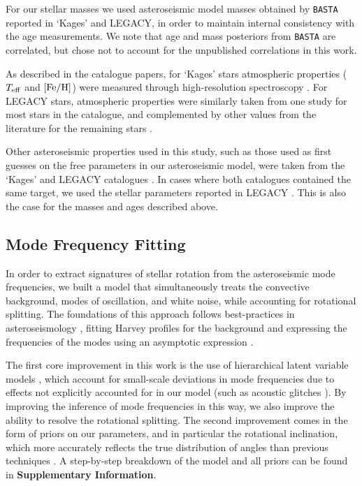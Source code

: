 \documentclass[12pt]{article}
\newcommand{\teff}{\mbox{$T_{\rm eff}$}\xspace}
\newcommand{\feh}{\mbox{$\rm{[Fe/H]}$}\xspace}
\begin{document}
For our stellar masses we used asteroseismic model masses obtained by \texttt{BASTA} reported in `Kages' and LEGACY, in order to maintain internal consistency with the age measurements. We note that age and mass posteriors from \texttt{BASTA} are correlated, but chose not to account for the unpublished correlations in this work.

As described in the catalogue papers, for `Kages' stars atmospheric properties (\teff and \feh) were measured through high-resolution spectroscopy \cite{huber+2013a}. For LEGACY stars, atmospheric properties were similarly taken from one study \cite{buchhave+latham2015} for most stars in the catalogue, and complemented by other values from the literature for the remaining stars \cite[see Table 3]{silvaaguirre+2017}.

Other asteroseismic properties used in this study, such as those used as first guesses on the free parameters in our asteroseismic model, were taken from the `Kages' and LEGACY catalogues \cite{astropycollaboration+2013, astropycollaboration+2018, ginsburg+2019}. In cases where both catalogues contained the same target, we used the stellar parameters reported in LEGACY \cite{mckinney2010}. This is also the case for the masses and ages described above.

\subsection{Mode Frequency Fitting}

In order to extract signatures of stellar rotation from the asteroseismic mode frequencies, we built a model that simultaneously treats the convective background, modes of oscillation, and white noise, while accounting for rotational splitting. The foundations of this approach follows best-practices in asteroseismology \cite{davies+2015}, fitting Harvey profiles for the background \cite{harvey1985} and expressing the frequencies of the modes using an asymptotic expression \cite{tassoul1980, vrard+2016}.

The first core improvement in this work is the use of hierarchical latent variable models \cite{hogg+2010, hall+2019}, which account for small-scale deviations in mode frequencies due to effects not explicitly accounted for in our model (such as acoustic glitches \cite{mazumdar+2014}). By improving the inference of mode frequencies in this way, we also improve the ability to resolve the rotational splitting. The second improvement comes in the form of priors on our parameters, and in particular the rotational inclination, which more accurately reflects the true distribution of angles than previous techniques \cite{chaplin+basu2017}. A step-by-step breakdown of the model and all priors can be found in \textbf{Supplementary Information}.\\
\end{document}
